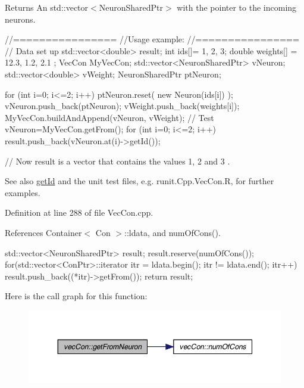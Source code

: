 \begin{DoxyReturn}{Returns}
An std::vector$<$NeuronSharedPtr$>$ with the pointer to the incoming neurons.
\end{DoxyReturn}

\begin{DoxyCode}
        //================
        //Usage example:
        //================
        // Data set up
                std::vector<double> result;
                int ids[]= {1, 2, 3};
                double weights[] = {12.3, 1.2, 2.1 };
                VecCon MyVecCon;
                std::vector<NeuronSharedPtr> vNeuron;
                std::vector<double> vWeight;
                NeuronSharedPtr ptNeuron;

                        for (int i=0; i<=2; i++) {
                                ptNeuron.reset( new Neuron(ids[i]) );
                                vNeuron.push_back(ptNeuron);
                                vWeight.push_back(weights[i]);
                        }
                        MyVecCon.buildAndAppend(vNeuron, vWeight);
                // Test
                        vNeuron=MyVecCon.getFrom();
                        for (int i=0; i<=2; i++) {
                                result.push_back(vNeuron.at(i)->getId());
                        }

        // Now result is a vector that contains the values 1, 2 and 3 .
\end{DoxyCode}


\begin{DoxySeeAlso}{See also}
\hyperlink{classvec_con_aa9f3f5df4c4060951c975c4c829b8471}{getId} and the unit test files, e.g. runit.Cpp.VecCon.R, for further examples. 
\end{DoxySeeAlso}


Definition at line 288 of file VecCon.cpp.



References Container$<$ Con $>$::ldata, and numOfCons().


\begin{DoxyCode}
                                                    {
        std::vector<NeuronSharedPtr> result;
        result.reserve(numOfCons());
        for(std::vector<ConPtr>::iterator itr = ldata.begin();   itr != 
      ldata.end();   itr++)   {
                result.push_back((*itr)->getFrom());
        }
        return result;
}
\end{DoxyCode}


Here is the call graph for this function:\nopagebreak
\begin{figure}[H]
\begin{center}
\leavevmode
\includegraphics[width=348pt]{classvec_con_ae72d00aedcd054e690f1dcf2ca5ac2c2_cgraph}
\end{center}
\end{figure}


